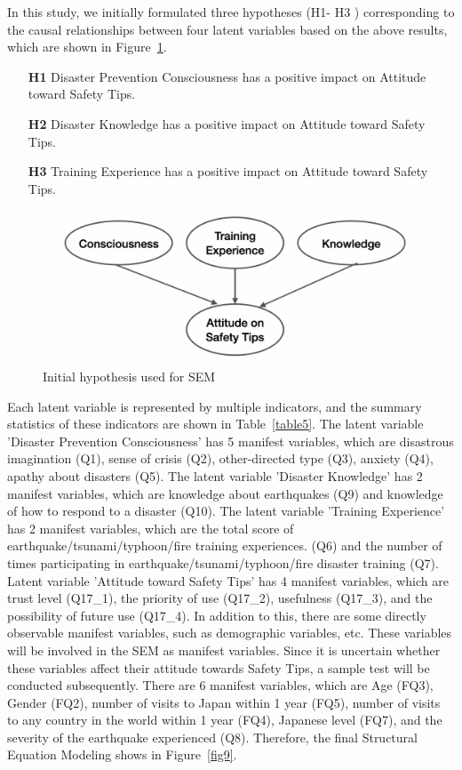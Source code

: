 In this study, we initially formulated three hypotheses (H1- H3 ) corresponding to the causal relationships between four latent variables based on the above results, which are shown in Figure~\ref{fig30}.

\begin{itemize}
\item[\textbf{H1}] Disaster Prevention Consciousness has a positive impact on Attitude toward Safety Tips.
\item[\textbf{H2}] Disaster Knowledge has a positive impact on Attitude toward Safety Tips.
\item[\textbf{H3}] Training Experience has a positive impact on Attitude toward Safety Tips.
\end{itemize}

\begin{figure}[h]
  \includegraphics[width=0.5\linewidth]{Figure/Figure30.jpg}
  \centering
  \caption{Initial hypothesis used for SEM}
  \label{fig30}
\end{figure}

Each latent variable is represented by multiple indicators, and the summary statistics of these indicators are shown in Table~\ref{table5}. The latent variable 'Disaster Prevention Consciousness' has 5 manifest variables, which are disastrous imagination (Q1), sense of crisis (Q2), other-directed type (Q3), anxiety (Q4), apathy about disasters (Q5). The latent variable 'Disaster Knowledge' has 2 manifest variables, which are knowledge about earthquakes (Q9) and knowledge of how to respond to a disaster (Q10). The latent variable 'Training Experience' has 2 manifest variables, which are the total score of earthquake/tsunami/typhoon/fire training experiences. (Q6) and the number of times participating in earthquake/tsunami/typhoon/fire disaster training (Q7). Latent variable 'Attitude toward Safety Tips' has 4 manifest variables, which are trust level (Q17\_1), the priority of use (Q17\_2), usefulness (Q17\_3), and the possibility of future use (Q17\_4). In addition to this, there are some directly observable manifest variables, such as demographic variables, etc. These variables will be involved in the SEM as manifest variables. Since it is uncertain whether these variables affect their attitude towards Safety Tips, a sample test will be conducted subsequently. There are 6 manifest variables, which are Age (FQ3), Gender (FQ2), number of visits to Japan within 1 year (FQ5), number of visits to any country in the world within 1 year (FQ4), Japanese level (FQ7), and the severity of the earthquake experienced (Q8). Therefore, the final Structural Equation Modeling shows in Figure~\ref{fig9}.

